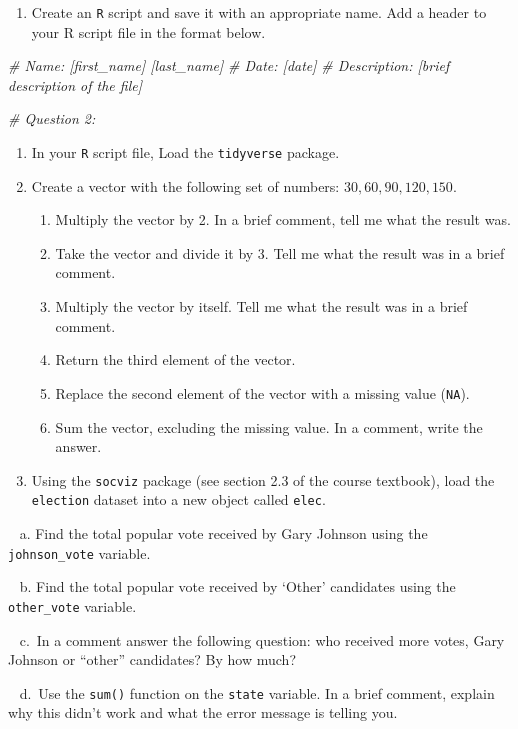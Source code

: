 \documentclass[
]{book}
\newenvironment{Shaded}{\begin{snugshade}}{\end{snugshade}}
\newcommand{\CommentTok}[1]{\textcolor[rgb]{0.56,0.35,0.01}{\textit{#1}}}
\providecommand{\tightlist}{%
  \setlength{\itemsep}{0pt}\setlength{\parskip}{0pt}}
\begin{document}
\begin{enumerate}
\def\labelenumi{\arabic{enumi}.}
\tightlist
\item
  Create an \texttt{R} script and save it with an appropriate name. Add a header to your R script file in the format below.
\end{enumerate}

\begin{Shaded}
\begin{Highlighting}[]
\CommentTok{\# Name: [first\_name] [last\_name]}
\CommentTok{\# Date: [date]}
\CommentTok{\# Description: [brief description of the file] }

\CommentTok{\# Question 2:}
\end{Highlighting}
\end{Shaded}

\begin{enumerate}
\def\labelenumi{\arabic{enumi}.}
\setcounter{enumi}{1}
\item
  In your \texttt{R} script file, Load the \texttt{tidyverse} package.
\item
  Create a vector with the following set of numbers: \({30, 60, 90, 120, 150}\).

  \begin{enumerate}
  \def\labelenumii{\alph{enumii}.}
  \item
    Multiply the vector by 2. In a brief comment, tell me what the result was.
  \item
    Take the vector and divide it by 3. Tell me what the result was in a brief comment.
  \item
    Multiply the vector by itself. Tell me what the result was in a brief comment.
  \item
    Return the third element of the vector.
  \item
    Replace the second element of the vector with a missing value (\texttt{NA}).
  \item
    Sum the vector, excluding the missing value. In a comment, write the answer.
  \end{enumerate}
\item
  Using the \texttt{socviz} package (see section 2.3 of the course textbook), load the \texttt{election} dataset into a new object called \texttt{elec}.
\end{enumerate}

~ a. Find the total popular vote received by Gary Johnson using the \texttt{johnson\_vote} variable.

~ b. Find the total popular vote received by `Other' candidates using the \texttt{other\_vote} variable.

~ c.~In a comment answer the following question: who received more votes, Gary Johnson or ``other'' candidates? By how much?

~ d.~Use the \texttt{sum()} function on the \texttt{state} variable. In a brief comment, explain why this didn't work and what the error message is telling you.

  
\end{document}
